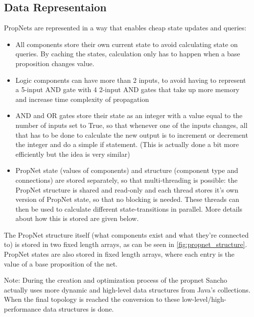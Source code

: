 \subsection{Data Representaion}
\noindent PropNets are represented in a way that enables cheap state updates and queries:
\begin{itemize}
	\item All components store their own current state to avoid calculating state on queries. By caching the states, calculation only has to happen when a base proposition changes value.
	
	\item Logic components can have more than 2 inputs, to avoid having to represent a 5-input AND gate with 4 2-input AND gates that take up more memory and increase time complexity of propagation
	
	\item AND and OR gates store their state as an integer with a value equal to the number of inputs set to True, so that whenever one of the inputs changes, all that has to be done to calculate the new output is to increment or decrement the integer and do a simple if statement. (This is actually done a bit more efficiently but the idea is very similar)
	
	\item PropNet state (values of components) and structure (component type and connections) are stored separately, so that multi-threading is possible: the PropNet structure is shared and read-only and each thread stores it's own version of PropNet state, so that no blocking is needed. These threads can then be used to calculate different state-transitions in parallel. More details about how this is stored are given below.
\end{itemize}

The PropNet structure itself (what components exist and what they're connected to) is stored in two fixed length arrays, as can be seen in \ref{fig:propnet_structure}.
PropNet states are also stored in fixed length arrays, where each entry is the value of a base proposition of the net.

Note: During the creation and optimization process of the propnet Sancho actually uses more dynamic and high-level data structures from Java's collections. When the final topology is reached the conversion to these low-level/high-performance data structures is done.
	
